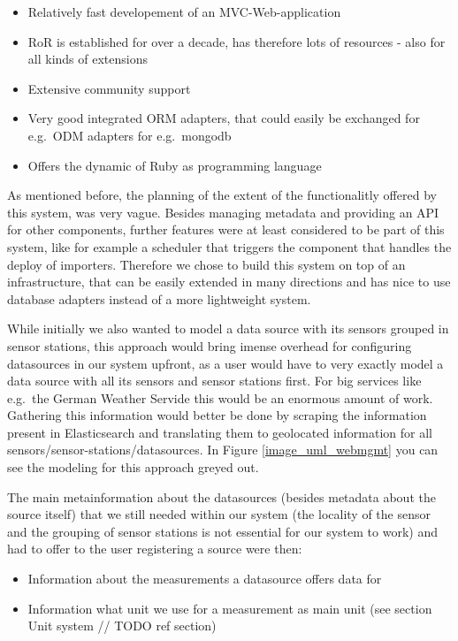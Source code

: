 \begin{itemize}
	\item
	Relatively fast developement of an MVC-Web-application
	\item
	RoR is established for over a decade, has therefore lots of resources
	- also for all kinds of extensions
	\item
	Extensive community support
	\item
	Very good integrated ORM adapters, that could easily be exchanged for
	e.g.~ODM adapters for e.g.~mongodb
	\item
	Offers the dynamic of Ruby as programming language
\end{itemize}

As mentioned before, the planning of the extent of the functionalitly
offered by this system, was very vague. Besides managing metadata and
providing an API for other components, further features were at least
considered to be part of this system, like for example a scheduler that
triggers the component that handles the deploy of importers. Therefore
we chose to build this system on top of an infrastructure, that can be
easily extended in many directions and has nice to use database adapters
instead of a more lightweight system.

While initially we also wanted to model a data source with its sensors
grouped in sensor stations, this approach would bring imense overhead
for configuring datasources in our system upfront, as a user would have
to very exactly model a data source with all its sensors and sensor
stations first. For big services like e.g.~the German Weather Servide
this would be an enormous amount of work. Gathering this information
would better be done by scraping the information present in
Elasticsearch and translating them to geolocated information for all
sensors/sensor-stations/datasources. In Figure \ref{image_uml_webmgmt} you can
see the modeling for this approach greyed out.

The main metainformation about the datasources (besides metadata about
the source itself) that we still needed within our system (the locality
of the sensor and the grouping of sensor stations is not essential for
our system to work) and had to offer to the user registering a source
were then:

\begin{itemize}
	\item
	Information about the measurements a datasource offers data for
	\item
	Information what unit we use for a measurement as main unit (see
	section Unit system // TODO ref section)
\end{itemize}

